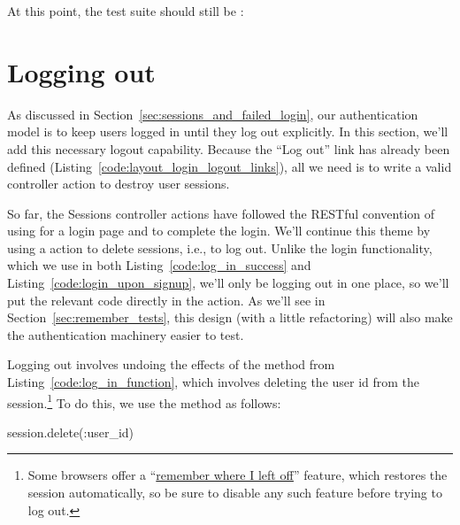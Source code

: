 At this point, the test suite should still be \passing:

\begin{codelisting}
\codecaption{\passing}
\end{codelisting}



  \section{Logging out} %
  \label{sec:logging_out}

As discussed in Section~\ref{sec:sessions_and_failed_login}, our authentication model is to keep users logged in until they log out explicitly. In this section, we'll add this necessary logout capability. Because the ``Log out'' link has already been defined (Listing~\ref{code:layout_login_logout_links}), all we need is to write a valid controller action to destroy user sessions.

So far, the Sessions controller actions have followed the RESTful convention of using  for a login page and  to complete the login. We'll continue this theme by using a  action to delete sessions, i.e., to log out. Unlike the login functionality, which we use in both Listing~\ref{code:log_in_success} and Listing~\ref{code:login_upon_signup}, we'll only be logging out in one place, so we'll put the relevant code directly in the  action. As we'll see in Section~\ref{sec:remember_tests}, this design (with a little refactoring) will also make the authentication machinery easier to test.

Logging out involves undoing the effects of the  method from Listing~\ref{code:log_in_function}, which involves deleting the user id from the session.\footnote{Some browsers offer a ``\href{http://stackoverflow.com/questions/20449641/rails-4-session-value-never-expires-or-dies-when-browser-closes}{remember where I left off}'' feature, which restores the session automatically, so be sure to disable any such feature before trying to log out.} To do this, we use the  method as follows:

\begin{code}
session.delete(:user_id)
\end{code}

